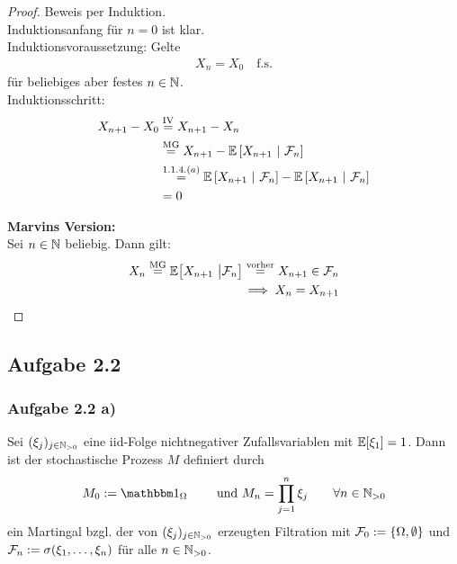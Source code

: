 \begin{proof}
	Beweis per Induktion.\\
	Induktionsanfang für $n=0$ ist klar.\\
	Induktionsvoraussetzung: Gelte
	\begin{align*}
		X_n = X_0 \quad \text{f.s.}
	\end{align*}
	für beliebiges aber festes $n\in\mathbb{N}$.\\
	Induktionsschritt:
	\begin{align*}
		X_{n+1}-X_0
		&\stackrel{\text{IV}}{=} X_{n+1} - X_{n} \\
		&\stackrel{\text{MG}}{=} X_{n+1} - \mathbb{E}\left[{X_{n+1}}~|~{\mathcal{F}_{n}}\right] \\
		&\stackrel{1.1.4.(a)}{=} \mathbb{E}\left[{X_{n+1}}~|~{\mathcal{F}_{n}}\right] - \mathbb{E}\left[{X_{n+1}}~|~{\mathcal{F}_{n}}\right] \\
		&= 0
	\end{align*}
	
	\textbf{Marvins Version:}\\
	Sei $n\in\mathbb{N}$ beliebig. Dann gilt:
	\begin{align*}
		X_n\stackrel{\text{MG}}{=} \mathbb{E}\big[X_{n+1}~\big|\mathcal{F}_n\big]\stackrel{\text{vorher}}{=} X_{n+1}\in\mathcal{F}_n\\
	\implies X_n=X_{n+1}
	\end{align*}
\end{proof}

\subsection{Aufgabe 2.2}
\subsubsection{Aufgabe 2.2 a)}
Sei $(\xi_j)_{j\in\mathbb{N}_{>0}}$ eine iid-Folge nichtnegativer Zufallsvariablen mit $\mathbb{E}[\xi_1]=1$. 
Dann ist der stochastische Prozess $M$ definiert durch
\begin{align*}
	M_0:=\indi_\Omega\qquad\text{ und }M_n=\prod\limits_{j=1}^n\xi_j\qquad\forall n\in\N_{>0}
\end{align*}
ein Martingal bzgl. der von $(\xi_j)_{j\in\mathbb{N}_{>0}}$ erzeugten Filtration  mit $\mathcal{F}_0:=\lbrace \Omega,\emptyset\rbrace$ und $\mathcal{F}_n:=\sigma(\xi_1,\ldots,\xi_n)$ für alle $n\in\mathbb{N}_{>0}$.

